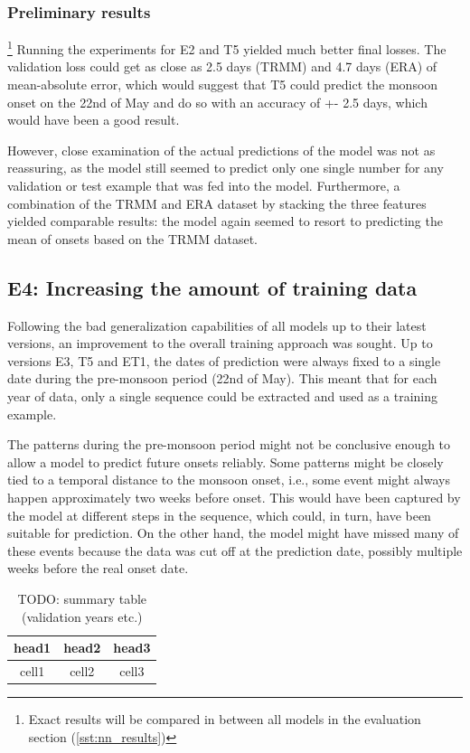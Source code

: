 \subsubsection{Preliminary results}{\footnote{Exact results will be compared in between all models in the evaluation section (\cref{sst:nn_results})}}
\label{ssst:nn_e2t5_results}
Running the experiments for E2 and T5 yielded much better final losses. The validation loss could get as close as 2.5 days (TRMM) and 4.7 days (ERA) of mean-absolute error, which would suggest that T5 could predict the monsoon onset on the 22nd of May and do so with an accuracy of +- 2.5 days, which would have been a good result.

However, close examination of the actual predictions of the model was not as reassuring, as the model still seemed to predict only one single number for any validation or test example that was fed into the model. Furthermore, a combination of the TRMM and ERA dataset by stacking the three features yielded comparable results: the model again seemed to resort to predicting the mean of onsets based on the TRMM dataset.


\clearpage
\subsection{E4: Increasing the amount of training data}
\label{sst:nn_e4}
Following the bad generalization capabilities of all models up to their latest versions, an improvement to the overall training approach was sought. Up to versions E3, T5 and ET1, the dates of prediction were always fixed to a single date during the pre-monsoon period (22nd of May). This meant that for each year of data, only a single sequence could be extracted and used as a training example.

The patterns during the pre-monsoon period might not be conclusive enough to allow a model to predict future onsets reliably. Some patterns might be closely tied to a temporal distance to the monsoon onset, i.e., some event might always happen approximately two weeks before onset. This would have been captured by the model at different steps in the sequence, which could, in turn, have been suitable for prediction. On the other hand, the model might have missed many of these events because the data was cut off at the prediction date, possibly multiple weeks before the real onset date.

\begin{table}[h]
  \centering
  \begin{tabular}{ |c|c|c| }
    \hline
    head1 & head2 & head3 \\
    \hline
    cell1 & cell2 & cell3 \\
    \hline
  \end{tabular}
  \caption{TODO: summary table (validation years etc.)}
  \label{tab:nn_e4_summary}
\end{table}


